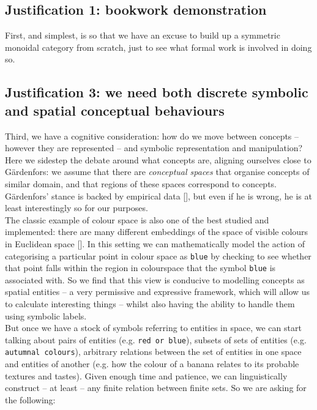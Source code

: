 \begin{fullwidth}
\subsection{Justification 1: bookwork demonstration}

First, and simplest, is so that we have an excuse to build up a symmetric monoidal category from scratch, just to see what formal work is involved in doing so.\\



\subsection{Justification 3: we need both discrete symbolic and spatial conceptual behaviours}\label{just:rel}

Third, we have a cognitive consideration: how do we move between concepts -- however they are represented -- and symbolic representation and manipulation? Here we sidestep the debate around what concepts are, aligning ourselves close to G\"{a}rdenfors: we assume that there are \emph{conceptual spaces} that organise concepts of similar domain, and that regions of these spaces correspond to concepts. G\"{a}rdenfors' stance is backed by empirical data [], but even if he is wrong, he is at least interestingly so for our purposes.\\

The classic example of colour space is also one of the best studied and implemented: there are many different embeddings of the space of visible colours in Euclidean space []. In this setting we can mathematically model the action of categorising a particular point in colour space as \texttt{blue} by checking to see whether that point falls within the region in colourspace that the symbol \texttt{blue} is associated with. So we find that this view is conducive to modelling concepts as spatial entities -- a very permissive and expressive framework, which will allow us to calculate interesting things -- whilst also having the ability to handle them using symbolic labels.\\

But once we have a stock of symbols referring to entities in space, we can start talking about pairs of entities (e.g. \texttt{red or blue}), subsets of sets of entities (e.g. \texttt{autumnal colours}), arbitrary relations between the set of entities in one space and entities of another (e.g. how the colour of a banana relates to its probable textures and tastes). Given enough time and patience, we can linguistically construct -- at least -- any finite relation between finite sets. So we are asking for the following:


\end{fullwidth}
